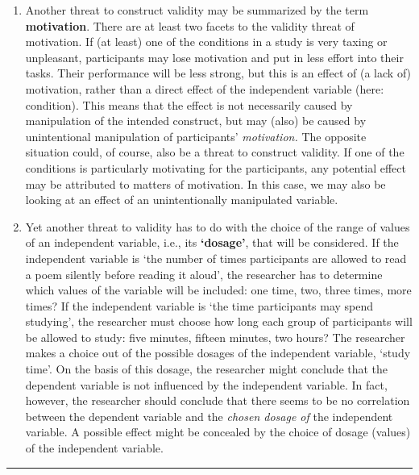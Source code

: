 \documentclass[
]{book}
\begin{document}
\begin{enumerate}
\def\labelenumi{\arabic{enumi}.}
\setcounter{enumi}{2}
\item
  Another threat to construct validity may be summarized by the term \textbf{motivation}. There are at least two facets to the validity threat of motivation. If (at least) one of the conditions in a study is very taxing or unpleasant, participants may lose motivation and put in less effort into their tasks. Their performance will be less strong, but this is an effect of (a lack of) motivation, rather than a direct effect of the independent variable (here: condition). This means that the effect is not necessarily caused by manipulation of the intended construct, but may (also) be caused by unintentional manipulation of participants' \emph{motivation.} The opposite situation could, of course, also be a threat to construct validity. If one of the conditions is particularly motivating for the participants, any potential effect may be attributed to matters of motivation. In this case, we may also be looking at an effect of an unintentionally manipulated variable.
\item
  Yet another threat to validity has to do with the choice of the range of values of an independent variable, i.e., its \textbf{`dosage'}, that will be considered. If the independent variable is `the number of times participants are allowed to read a poem silently before reading it aloud', the researcher has to determine which values of the variable will be included: one time, two, three times, more times? If the independent variable is `the time participants may spend studying', the researcher must choose how long each group of participants will be allowed to study: five minutes, fifteen minutes, two hours? The researcher makes a choice out of the possible dosages of the independent variable, `study time'. On the basis of this dosage, the researcher might conclude that the dependent variable is not influenced by the independent variable. In fact, however, the researcher should conclude that there seems to be no correlation between the dependent variable and the \emph{chosen dosage of} the independent variable. A possible effect might be concealed by the choice of dosage (values) of the independent variable.
\end{enumerate}

\begin{center}\rule{0.5\linewidth}{0.5pt}\end{center}
\end{document}
